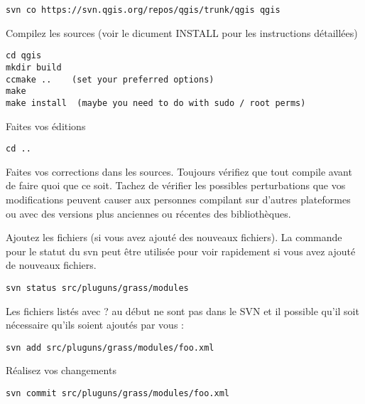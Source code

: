 \begin{verbatim}
svn co https://svn.qgis.org/repos/qgis/trunk/qgis qgis
\end{verbatim}

Compilez les sources (voir le dicument INSTALL pour les instructions détaillées)

\begin{verbatim}
cd qgis
mkdir build
ccmake ..    (set your preferred options)
make
make install  (maybe you need to do with sudo / root perms)
\end{verbatim}

Faites vos éditions

\begin{verbatim}
cd ..
\end{verbatim}

Faites vos corrections dans les sources. Toujours vérifiez que tout compile avant de faire quoi que ce soit. Tachez de vérifier les possibles perturbations que vos modifications peuvent causer aux personnes compilant sur d'autres plateformes ou avec des versions plus anciennes ou récentes des bibliothèques.

Ajoutez les fichiers (si vous avez ajouté des nouveaux fichiers). La commande pour le statut du svn peut être utilisée pour voir rapidement si vous avez ajouté de nouveaux fichiers.

\begin{verbatim}
svn status src/pluguns/grass/modules
\end{verbatim}

Les fichiers listés avec ? au début ne sont pas dans le SVN et il possible qu'il soit nécessaire qu'ils soient ajoutés par vous :

\begin{verbatim}
svn add src/pluguns/grass/modules/foo.xml
\end{verbatim}

Réalisez vos changements

\begin{verbatim}
svn commit src/pluguns/grass/modules/foo.xml
\end{verbatim}

